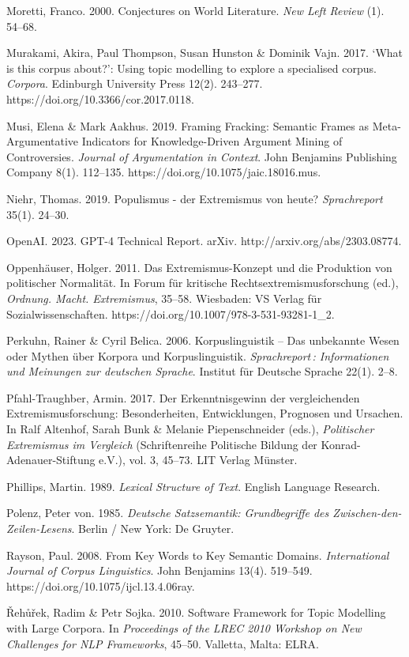 Moretti, Franco. 2000. Conjectures on World Literature. \emph{New Left Review} (1). 54--68.

Murakami, Akira, Paul Thompson, Susan Hunston \& Dominik Vajn. 2017. `What is this corpus about?': Using topic modelling to explore a specialised corpus. \emph{Corpora}. Edinburgh University Press 12(2). 243--277. https://doi.org/10.3366/cor.2017.0118.

Musi, Elena \& Mark Aakhus. 2019. Framing Fracking: Semantic Frames as Meta-Argumentative Indicators for Knowledge-Driven Argument Mining of Controversies. \emph{Journal of Argumentation in Context}. John Benjamins Publishing Company 8(1). 112--135. https://doi.org/10.1075/jaic.18016.mus.

Niehr, Thomas. 2019. Populismus - der Extremismus von heute? \emph{Sprachreport} 35(1). 24--30.

OpenAI. 2023. GPT-4 Technical Report. arXiv. http://arxiv.org/abs/2303.08774.

Oppenhäuser, Holger. 2011. Das Extremismus-Konzept und die Produktion von politischer Normalität. In Forum für kritische Rechtsextremismusforschung (ed.), \emph{Ordnung. Macht. Extremismus}, 35--58. Wiesbaden: VS Verlag für Sozialwissenschaften. https://doi.org/10.1007/978-3-531-93281-1\_2.

Perkuhn, Rainer \& Cyril Belica. 2006. Korpuslinguistik -- Das unbekannte Wesen oder Mythen über Korpora und Korpuslinguistik. \emph{Sprachreport\,: Informationen und Meinungen zur deutschen Sprache}. Institut für Deutsche Sprache 22(1). 2--8.

Pfahl-Traughber, Armin. 2017. Der Erkenntnisgewinn der vergleichenden Extremismusforschung: Besonderheiten, Entwicklungen, Prognosen und Ursachen. In Ralf Altenhof, Sarah Bunk \& Melanie Piepenschneider (eds.), \emph{Politischer Extremismus im Vergleich} (Schriftenreihe Politische Bildung der Konrad-Adenauer-Stiftung e.V.), vol. 3, 45--73. LIT Verlag Münster.

Phillips, Martin. 1989. \emph{Lexical Structure of Text}. English Language Research.

Polenz, Peter von. 1985. \emph{Deutsche Satzsemantik: Grundbegriffe des Zwischen-den-Zeilen-Lesens}. Berlin / New York: De Gruyter.

Rayson, Paul. 2008. From Key Words to Key Semantic Domains. \emph{International Journal of Corpus Linguistics}. John Benjamins 13(4). 519--549. https://doi.org/10.1075/ijcl.13.4.06ray.

Řehůřek, Radim \& Petr Sojka. 2010. Software Framework for Topic Modelling with Large Corpora. In \emph{Proceedings of the LREC 2010 Workshop on New Challenges for NLP Frameworks}, 45--50. Valletta, Malta: ELRA.

